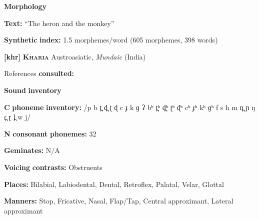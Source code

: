 \documentclass[output=paper]{langsci/langscibook}
\begin{document}
\begin{styleBody}
\textbf{Morphology}
\end{styleBody}

\begin{styleBody}
\textbf{Text:} “The heron and the monkey” \citep[516-520]{Donohue1999}
\end{styleBody}

\begin{styleBody}
\textbf{Synthetic} \textbf{index:} 1.5 morphemes/word (605 morphemes, 398 words)
\end{styleBody}

\begin{styleBody}
\textbf{[khr]}   \textbf{\textsc{Kharia}}    Austroasiatic, \textit{Mundaic} (India)
\end{styleBody}

\begin{styleBody}
References \textbf{consulted:} \citet{Peterson2011}
\end{styleBody}

\begin{styleBody}
\textbf{Sound} \textbf{inventory}
\end{styleBody}

\begin{styleBody}
\textbf{C} \textbf{phoneme} \textbf{inventory:} /p b t̪ d̪ ʈ ɖ c ɟ k ɡ ʔ bʰ t̪ʰ d̪ʰ ʈʰ ɖʰ cʰ ɟʰ kʰ ɡʰ f s h m n̪ ɲ ŋ ɾ̪ ɽ l̪ w j/
\end{styleBody}

\begin{styleBody}
\textbf{N} \textbf{consonant} \textbf{phonemes:} 32
\end{styleBody}

\begin{styleBody}
\textbf{Geminates:} N/A
\end{styleBody}

\begin{styleBody}
\textbf{Voicing} \textbf{contrasts:} Obstruents
\end{styleBody}

\begin{styleBody}
\textbf{Places:} Bilabial, Labiodental, Dental, Retroflex, Palatal, Velar, Glottal
\end{styleBody}

\begin{styleBody}
\textbf{Manners:} Stop, Fricative, Nasal, Flap/Tap, Central approximant, Lateral approximant
\end{styleBody}
\end{document}
